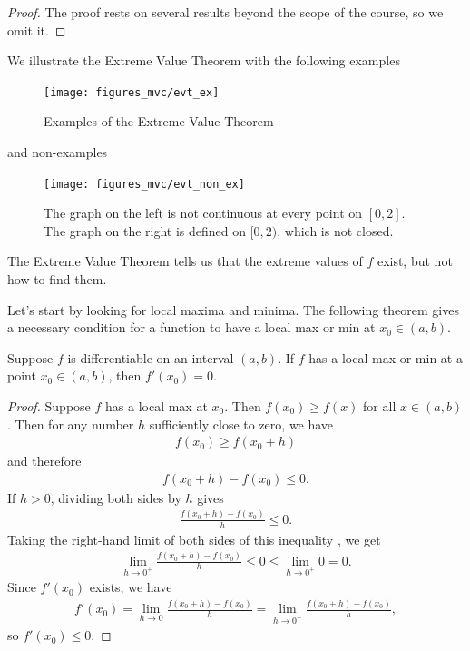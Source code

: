\documentclass[12pt,letterpaper,reqno]{article}
\numberwithin{equation}{section}
\newcommand{\fixme}[1]{{\color{orange}{[#1]}}}
\begin{document}
{\begin{proof}
	The proof rests on several results beyond the scope of the course, so we omit it.
\end{proof}

We illustrate the Extreme Value Theorem with the following examples
\begin{figure}[h]
	\begin{center}
	\texttt{[image: figures\_mvc/evt\_ex]}
	\end{center}	
	\caption{Examples of the Extreme Value Theorem}
\end{figure}

and non-examples

\begin{figure}[h]
	\begin{center}
	\texttt{[image: figures\_mvc/evt\_non\_ex]}
	\end{center}	
	\caption{The graph on the left is not continuous at every point on $[0,2]$. The graph on the right is defined on $[0,2)$, which is not closed.}
\end{figure}
The Extreme Value Theorem tells us that the extreme values of $f$ exist, but not how to find them. 

Let's start by looking for local maxima and minima. The following theorem gives a necessary condition for a function to have a local max or min at $x_0 \in (a,b)$.

\begin{thm}\label{thm:fermats_theorem}
Suppose $f$ is differentiable on an interval $(a,b)$. If $f$ has a local max or min at a point $x_0 \in (a,b)$, then $f'(x_0)=0$.
\end{thm}

\begin{proof}
	Suppose $f$ has a local max at $x_0$. Then $f(x_0)\geq f(x)$ for all $x \in (a,b)$. Then for any number $h$ sufficiently close to zero, we have
	\begin{align*}
		f(x_0) \geq f(x_0+h)
	\end{align*}
	and therefore
	\begin{align}\label{eq:fermat_inequality}
		f(x_0+h)-f(x_0) \leq 0.
	\end{align}
	If $h>0$, dividing both sides by $h$ gives
	\begin{align*}
		\frac{f(x_0+h)-f(x_0)}{h}\leq 0.
	\end{align*}
	Taking the right-hand limit of both sides of this inequality \fixme{Justify this.}, we get
	\begin{align*}
		\lim_{h \to 0^+}\frac{f(x_0+h)-f(x_0)}{h}\leq 0 \leq \lim_{h \to 0^+}0=0.
	\end{align*}
	Since $f'(x_0)$ exists, we have
	\begin{align*}
		f'(x_0)=\lim_{h \to 0}\frac{f(x_0+h)-f(x_0)}{h}=\lim_{h \to 0^+}\frac{f(x_0+h)-f(x_0)}{h},
	\end{align*}
	so $f'(x_0) \leq 0$.
	

\end{proof}}
\end{document}

